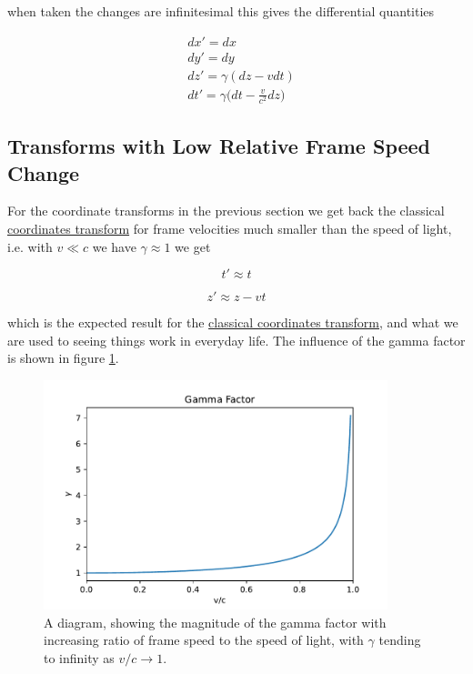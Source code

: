 when taken the changes are infinitesimal this gives the differential quantities

\begin{equation}
	\label{eq: Infintesmal interval of Coordinates}
	\begin{aligned}
		 & dx{'}=dx                                        \\
		 & dy{'}=dy                                        \\
		 & dz{'} = {\gamma} (dz-vdt)                       \\
		 & dt{'}={\gamma} \bigg(dt-\frac{v}{c^2} dz \bigg)
	\end{aligned}
\end{equation}

\subsection{Transforms with Low Relative Frame Speed Change}

For the coordinate transforms in the previous section we get back the classical \hyperlink{def-galilean-transform}{coordinates transform} for frame velocities much smaller than the speed of light, i.e. with $v\ll c$ we have ${\gamma} \approx 1$ we get

\begin{equation}
	t{'} \approx t
\end{equation}

\begin{equation}
	z{'} \approx z - vt
\end{equation}

which is the expected result for the \hyperlink{def-galilean-transform}{classical coordinates transform}, and what we are used to seeing things work in everyday life. The influence of the gamma factor is shown in figure \ref{fig: Gamma Factor}.

\begin{figure}[H]
	\centering
	\includegraphics[width=10cm]{images/pdf/Gamma_Factor.pdf}
	\caption{A diagram, showing the magnitude of the gamma factor with increasing ratio of frame speed to the speed of light, with ${\gamma}$ tending to infinity as $v/c\rightarrow 1$.}
	\label{fig: Gamma Factor}
\end{figure}


